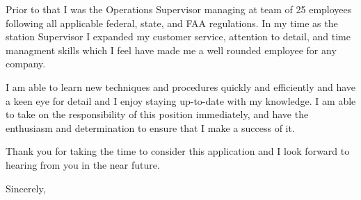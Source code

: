\documentclass[letterpaper]{ReadableCV}
\begin{document}
Prior to that I was the Operations Supervisor managing at team of 25 employees following all applicable federal, state, and FAA regulations. In my time as the station Supervisor I expanded my customer service, attention to detail, and time managment skills which I feel have made me a well rounded employee for any company.

I am able to learn new techniques and procedures quickly and efficiently and have a keen eye for detail and I enjoy staying up-to-date with my knowledge. I am able to take on the responsibility of this position immediately, and have the enthusiasm and determination to ensure that I make a success of it.

Thank you for taking the time to consider this application and I look forward to hearing from you in the near future.

\bigskip

Sincerely, %

\end{document}
